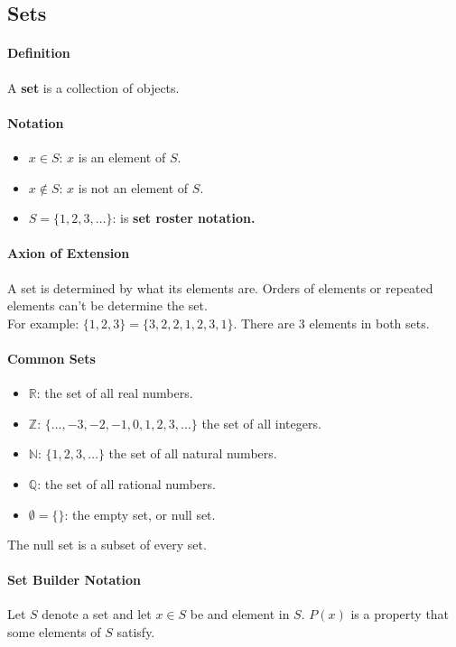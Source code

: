 \subsection{Sets}
\paragraph*{Definition} 
A \textbf{set} is a collection of objects.

\paragraph*{Notation} 
\begin{itemize}
    \item $x \in S$: $x$ is an element of $S$.
    \item $x \notin S$: $x$ is not an element of $S$.
    \item $S = \{1,2,3, \dots\}$: is \textbf{set roster notation.}
\end{itemize}

\paragraph*{Axion of Extension}
A set is determined by what its elements are. Orders of elements or repeated elements can't be determine the set.\\
For example: $\{1,2,3\} = \{3,2,2,1,2,3,1\}$. There are 3 elements in both sets.

\paragraph*{Common Sets}
\begin{itemize}
    \item $\mathbb{R}$: the set of all real numbers.
    \item $\mathbb{Z}$: $\{\dots , -3,-2,-1,0,1,2,3,\dots\}$ the set of all integers.
    \item $\mathbb{N}$: $\{1,2,3,\dots\}$ the set of all natural numbers.
    \item $\mathbb{Q}$: the set of all rational numbers.
    \item $\emptyset = \{\}$: the empty set, or null set.
\end{itemize}

The null set is a subset of every set.

\paragraph*{Set Builder Notation}
Let $S$ denote a set and let $x\in S$ be and element in $S$. $P(x)$ is a property that some elements of $S$ satisfy.

